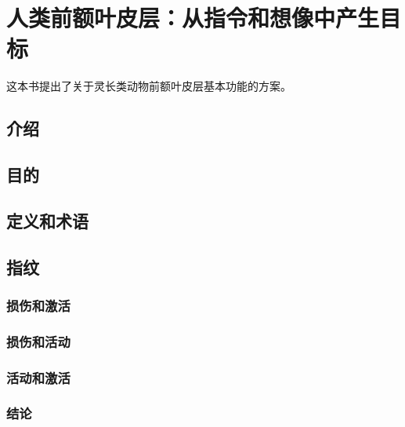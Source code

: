\chapter{人类前额叶皮层：从指令和想像中产生目标}
这本书提出了关于灵长类动物前额叶皮层基本功能的方案。

\section{介绍}

\section{目的}

\section{定义和术语}


\section{指纹}

\subsection{损伤和激活}

\subsection{损伤和活动}

\subsection{活动和激活}




\subsection{结论}


